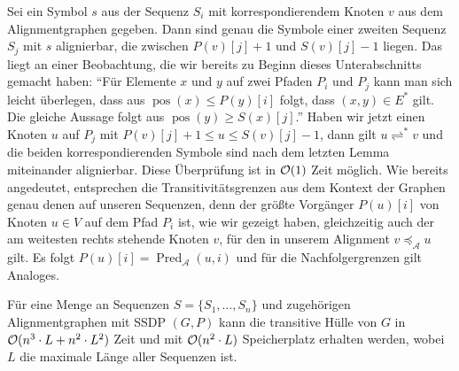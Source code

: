 Sei ein Symbol $s$ aus der Sequenz $S_i$ mit korrespondierendem Knoten $v$ aus dem Alignmentgraphen gegeben. Dann sind genau die Symbole einer zweiten Sequenz $S_j$ mit $s$ alignierbar, die zwischen $P(v)[j] + 1$ und $S(v)[j] - 1$ liegen. Das liegt an einer Beobachtung, die wir bereits zu Beginn dieses Unterabschnitts gemacht haben: \enquote{Für Elemente $x$ und $y$ auf zwei Pfaden $P_i$ und $P_j$ kann man sich leicht überlegen, dass aus $\operatorname{pos}(x) \leq P(y)[i]$ folgt, dass $(x,y)\in E^*$ gilt. Die gleiche Aussage folgt aus $\operatorname{pos}(y) \geq S(x)[j]$.} Haben wir jetzt einen Knoten $u$ auf $P_j$ mit $P(v)[j] +1 \leq u \leq S(v)[j] - 1$, dann gilt $u \rightleftharpoons^{*} v$ und die beiden korrespondierenden Symbole sind nach dem letzten Lemma miteinander alignierbar. Diese Überprüfung ist in $\mathcal{O}(1)$ Zeit möglich. Wie bereits angedeutet, entsprechen die Transitivitätsgrenzen aus dem Kontext der Graphen genau denen auf unseren Sequenzen, denn der größte Vorgänger $P(u)[i]$ von Knoten $u\in V$ auf dem Pfad $P_i$  ist, wie wir gezeigt haben, gleichzeitig auch der am weitesten rechts stehende Knoten $v$, für den in unserem Alignment $v \preceq_{\mathcal{A}} u$ gilt. Es folgt $P(u)[i] = \operatorname{Pred}_{\mathcal{A}}(u,i)$ und für die Nachfolgergrenzen gilt Analoges.

\begin{korollar}
	Für eine Menge an Sequenzen $S = \{S_1, \dots, S_n\}$ und zugehörigen Alignmentgraphen mit SSDP $(G,P)$ kann die transitive Hülle von $G$ in $\mathcal{O}(n^3\cdot L + n^2\cdot L^2)$ Zeit und mit $\mathcal{O}(n^2\cdot L)$ Speicherplatz erhalten werden, wobei $L$ die maximale Länge aller Sequenzen ist.
\end{korollar}

